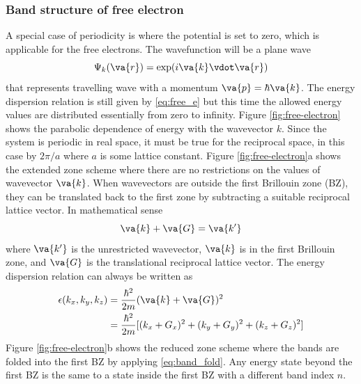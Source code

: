 
        \subsubsection{Band structure of free electron}
            A special case of periodicity is where the potential is set to zero, which is applicable for the free electrons. The wavefunction will be a plane wave 
            \begin{equation}
                \Psi_k(\va{r})  = \exp(i \va{k} \vdot \va{r})
            \end{equation} 
        that represents travelling wave with a momentum $\va{p} = \hbar \va{k}$. The energy dispersion relation is still given by \eqref{eq:free_e} but this time the allowed energy values are distributed essentially from zero to infinity. Figure \ref{fig:free-electron} shows the parabolic dependence of energy with the wavevector $k$. Since the system is periodic in real space, it must be true for the reciprocal space, in this case by $2\pi/a$ where $a$ is some lattice constant. Figure \ref{fig:free-electron}a shows the extended zone scheme where there are no restrictions on the values of wavevector $\va{k}$. When wavevectors are outside the first Brillouin zone (BZ), they can be translated back to the first zone by subtracting a suitable reciprocal lattice vector. In mathematical sense \citep{Kittel2004}
        \begin{equation} \label{eq:band_fold}
            \va{k} + \va{G} = \va{k'}
        \end{equation}
        where $\va{k'}$ is the unrestricted wavevector, $\va{k}$ is in the first Brillouin zone, and $\va{G}$ is the translational reciprocal lattice vector. The energy dispersion relation can always be written as 
        \begin{align}
            \epsilon(k_x,k_y,k_z) &= \frac{\hbar^2}{2m} (\va{k}+\va{G})^2 \notag \\
                                &= \frac{\hbar^2}{2m}[(k_x + G_x)^2 + (k_y + G_y)^2 + (k_z + G_z)^2]
        \end{align}
        Figure \ref{fig:free-electron}b shows the reduced zone scheme where the  bands are folded into the first BZ by applying \eqref{eq:band_fold}. Any energy state beyond the first BZ is the same to a state inside the first BZ with a different band index $n$.

